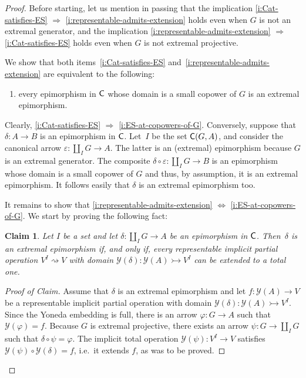 \documentclass[a4paper,10pt,reqno]{amsart}
\newtheorem{claim}[theorem]{Claim}
\theoremstyle{definition}
\theoremstyle{remark}
\renewcommand{\phi}{\varphi}
\renewcommand{\epsilon}{\varepsilon}
\newcommand{\cat}{{\sf C}}								%
\newcommand{\yo}{\mathcal{Y}}
\newcommand{\IMP}{\Rightarrow}						%
\newcommand{\IFF}{\Leftrightarrow}						%
\begin{document}
\begin{proof}
Before starting, let us mention in passing that the implication \ref{i:Cat-satisfies-ES} $\IMP$ \ref{i:representable-admits-extension} holds even when $G$ is not an extremal generator, and the implication \ref{i:representable-admits-extension} $\IMP$ \ref{i:Cat-satisfies-ES} holds even when $G$ is not extremal projective. 

We show that both items~\ref{i:Cat-satisfies-ES} and~\ref{i:representable-admits-extension} are equivalent to the following: 
\begin{enumerate}[label=(\arabic*),resume=implicitops]
\item\label{i:ES-at-copowers-of-G} every epimorphism in $\cat$ whose domain is a small copower of $G$ is an extremal epimorphism.
\end{enumerate}

Clearly, \ref{i:Cat-satisfies-ES} $\IMP$ \ref{i:ES-at-copowers-of-G}. Conversely, suppose that $\delta\colon A\to B$ is an epimorphism in $\cat$. Let~$I$ be the set $\cat(G,A)$, and consider the canonical arrow $\epsilon\colon \coprod_{I}G \to A$. The latter is an (extremal) epimorphism because $G$ is an extremal generator. The composite $\delta\circ \epsilon \colon \coprod_{I}G \to B$ is an epimorphism whose domain is a small copower of $G$ and thus, by assumption, it is an extremal epimorphism. It follows easily that $\delta$ is an extremal epimorphism too.

It remains to show that \ref{i:representable-admits-extension} $\IFF$ \ref{i:ES-at-copowers-of-G}. We start by proving the following fact:
%
\begin{claim}\label{claim:ext-epi-iff-total}
Let $I$ be a set and let $\delta\colon \coprod_{I}G \to A$ be an epimorphism in $\cat$. Then~$\delta$ is an extremal epimorphism if, and only if, every representable implicit partial operation $V^{I} \rightsquigarrow V$ with domain $\yo(\delta)\colon \yo(A)\rightarrowtail V^{I}$ can be extended to a total one.
\end{claim}
%
\begin{proof}[Proof of Claim]
Assume that $\delta$ is an extremal epimorphism and let $f\colon \yo(A)\to V$ be a representable implicit partial operation with domain $\yo(\delta)\colon \yo(A)\rightarrowtail V^{I}$. Since the Yoneda embedding is full, there is an arrow $\phi\colon G\to A$ such that $\yo(\phi)=f$. Because $G$ is extremal projective, there exists an arrow $\psi\colon G\to \coprod_{I}{G}$ such that $\delta\circ \psi = \phi$. The implicit total operation $\yo(\psi)\colon V^{I}\to V$ satisfies $\yo(\psi)\circ \yo(\delta) = f$, i.e.\ it extends $f$, as was to be proved.


\end{proof}
\end{proof}
\end{document}
